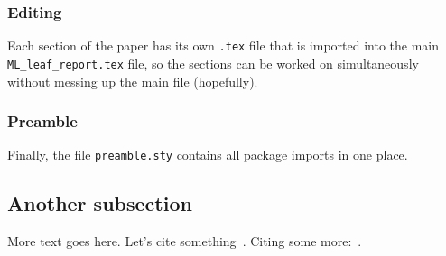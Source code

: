 \subsubsection{Editing}
Each section of the paper has its own \verb+.tex+ file that is imported into the main \verb+ML_leaf_report.tex+ file, so the sections can be worked on simultaneously without messing up the main file (hopefully).

\subsubsection{Preamble}
Finally, the file \verb+preamble.sty+ contains all package imports in one place.

\subsection{Another subsection}
More text goes here.
Let's cite something~\cite{dijkstra68}.
Citing some more:~\cite{charniak85,steels98}.